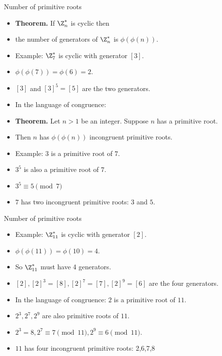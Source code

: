 \documentclass[handout]{beamer}
\begin{document}
\begin{frame}{Number of primitive roots}

\begin{itemize}
  \item \textbf{Theorem.} If $\Z_n^*$ is cyclic then
  \item the number of generators of $\Z_n^*$ is $\phi(\phi(n))$.
  \item Example: $\Z_7^*$ is cyclic with generator $[3]$.
  \item $\phi(\phi(7)) = \phi(6) = 2$.
  \item $[3]$ and $[3]^5 = [5]$ are the two generators.
  \item In the language of congruence:
  \item \textbf{Theorem.} Let $n>1$ be an integer. Suppose $n$ has a primitive root.
  \item Then $n$ has $\phi(\phi(n))$ incongruent primitive roots.
  \item Example: $3$ is a primitive root of $7$.
  \item $3^5$ is also a primitive root of $7$.
  \item $3^5 \equiv 5 \pmod 7$
  \item $7$ has two incongruent primitive roots: $3$ and $5$.
\end{itemize}

\end{frame}

\begin{frame}{Number of primitive roots}

\begin{itemize}
  \item Example: $\Z_{11}^*$ is cyclic with generator $[2]$.
  \item $\phi(\phi(11)) = \phi(10) = 4$.
  \item So $\Z_{11}^*$ must have 4 generators.
  \item $[2],[2]^3=[8], [2]^7=[7], [2]^9 = [6]$ are the four generators.
  \item In the language of congruence: $2$ is a primitive root of $11$.
  \item $2^3,2^7,2^9$ are also primitive roots of $11$.
  \item $2^3 = 8, 2^7 \equiv 7 \pmod{11}, 2^9 \equiv 6 \pmod {11}$.
  \item $11$ has four incongruent primitive roots: 2,6,7,8
\end{itemize}

\end{frame}
\end{document}

